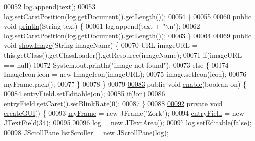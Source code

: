 \begin{DoxyCode}
00052         log.append(text);
00053         log.setCaretPosition(log.getDocument().getLength());
00054     \}
00055 
\hypertarget{UserInterface_8java_source_l00060}{}\hyperlink{classUserInterface_a79f606b4b1f5d1523e50eea00039ed94}{00060}     \textcolor{keyword}{public} \textcolor{keywordtype}{void} \hyperlink{classUserInterface_a79f606b4b1f5d1523e50eea00039ed94}{println}(String text) \{
00061         log.append(text + \textcolor{stringliteral}{"\(\backslash\)n"});
00062         log.setCaretPosition(log.getDocument().getLength());
00063     \}
00064 
\hypertarget{UserInterface_8java_source_l00069}{}\hyperlink{classUserInterface_ab793a0f12878c698ba3e1720a9f86f3b}{00069}     \textcolor{keyword}{public} \textcolor{keywordtype}{void} \hyperlink{classUserInterface_ab793a0f12878c698ba3e1720a9f86f3b}{showImage}(String imageName) \{
00070         URL imageURL = this.getClass().getClassLoader().getResource(imageName);
00071         \textcolor{keywordflow}{if}(imageURL == null)
00072             System.out.println(\textcolor{stringliteral}{"image not found"});
00073         \textcolor{keywordflow}{else} \{
00074             ImageIcon icon = \textcolor{keyword}{new} ImageIcon(imageURL);
00075             image.setIcon(icon);
00076             myFrame.pack();
00077         \}
00078     \}
00079 
\hypertarget{UserInterface_8java_source_l00083}{}\hyperlink{classUserInterface_ab9e499c6c847d52c8753f08d62f1adfc}{00083}     \textcolor{keyword}{public} \textcolor{keywordtype}{void} \hyperlink{classUserInterface_ab9e499c6c847d52c8753f08d62f1adfc}{enable}(\textcolor{keywordtype}{boolean} on) \{
00084         entryField.setEditable(on);
00085         \textcolor{keywordflow}{if}(!on)
00086             entryField.getCaret().setBlinkRate(0);
00087     \}
00088 
\hypertarget{UserInterface_8java_source_l00092}{}\hyperlink{classUserInterface_a5aa4ca5e24c9fce93ef91e5a6d0abd60}{00092}     \textcolor{keyword}{private} \textcolor{keywordtype}{void} \hyperlink{classUserInterface_a5aa4ca5e24c9fce93ef91e5a6d0abd60}{createGUI}() \{
00093         \hyperlink{classUserInterface_a1bb844238b260f6d4ae1852b6b1e0b97}{myFrame} = \textcolor{keyword}{new} JFrame(\textcolor{stringliteral}{"Zork"});
00094         \hyperlink{classUserInterface_a940367d996e9e7ad6e1fa1abfe35128b}{entryField} = \textcolor{keyword}{new} JTextField(34);
00095 
00096         \hyperlink{classUserInterface_a7f6ed10812f99e2cc6ce5f497d8ba2a0}{log} = \textcolor{keyword}{new} JTextArea();
00097         log.setEditable(\textcolor{keyword}{false});
00098         JScrollPane listScroller = \textcolor{keyword}{new} JScrollPane(\hyperlink{classUserInterface_a7f6ed10812f99e2cc6ce5f497d8ba2a0}{log});

\end{DoxyCode}

